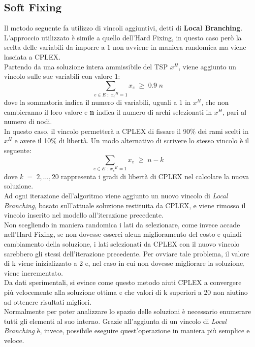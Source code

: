 \subsection{Soft Fixing}\label{soft_fixing}
Il metodo seguente fa utilizzo di vincoli aggiuntivi, detti di \textbf{Local Branching}\cite{local_branching}. L'approccio utilizzato è simile a quello dell'Hard Fixing, in questo caso però la scelta delle variabili da imporre a $1$ non avviene in maniera randomica ma viene lasciata a CPLEX.\\
Partendo da una soluzione intera ammissibile del TSP $x^H$, viene aggiunto un vincolo sulle sue variabili con valore $1$:\\
$$\underset{e\in E\; : \; {x_e}^{H}=1}\sum{x_e}\;\geq\; 0.9\;n$$
dove la sommatoria indica il numero di variabili, uguali a $1$ in $x^H$, che non cambieranno il loro valore e \textbf{n} indica il numero di archi selezionati in $x^H$, pari al numero di nodi.\\
In questo caso, il vincolo permetterà a CPLEX di fissare il 90\% dei rami scelti in $x^H$ e avere il 10\% di libertà.
Un modo alternativo di scrivere lo stesso vincolo è il seguente:
$$\underset{e\in E\; : \; {x_e}^{H}=1}\sum{x_e}\;\geq\; n-k$$
dove $k\;=\;2,...,20$ rappresenta i gradi di libertà di CPLEX nel calcolare la nuova soluzione.\\
Ad ogni iterazione dell'algoritmo viene aggiunto un nuovo vincolo di \textit{Local Branching}, basato sull'attuale soluzione restituita da CPLEX, e viene rimosso il vincolo inserito nel modello all'iterazione precedente.\\
Non scegliendo in maniera randomica i lati da selezionare, come invece accade nell'Hard Fixing, se non dovesse esserci alcun miglioramento del costo e quindi cambiamento della soluzione, i lati selezionati da CPLEX con il nuovo vincolo sarebbero gli stessi dell'iterazione precedente. Per ovviare tale problema, il valore di k viene inizializzato a 2 e, nel caso in cui non dovesse migliorare la soluzione, viene incrementato.\\
Da dati sperimentali, si evince come questo metodo aiuti CPLEX a convergere più velocemente alla soluzione ottima e che valori di k superiori a 20 non aiutino ad ottenere risultati migliori.\\
Normalmente per poter analizzare lo spazio delle soluzioni è necessario enumerare tutti gli elementi al suo interno. Grazie all'aggiunta di un vincolo di \textit{Local Branching} è, invece, possibile eseguire quest'operazione in maniera più semplice e veloce.\\ 
